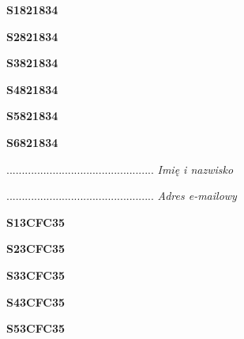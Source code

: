 \begin{turn}{90}\huge \textbf{S1821834}\end{turn}

\begin{turn}{90}\huge \textbf{S2821834}\end{turn}

\begin{turn}{90}\huge \textbf{S3821834}\end{turn}

\begin{turn}{90}\huge \textbf{S4821834}\end{turn}

\begin{turn}{90}\huge \textbf{S5821834}\end{turn}

\begin{turn}{90}\huge \textbf{S6821834}\end{turn}

\begin{turn}{90}\begin{minipage}{\linewidth} \vspace{20mm} ................................................  \textit{Imię i nazwisko}\end{minipage}\end{turn}

\begin{turn}{90}\begin{minipage}{\linewidth} \vspace{20mm} ................................................  \textit{Adres e-mailowy}\end{minipage}\end{turn}

\begin{turn}{90}\huge \textbf{S13CFC35}\end{turn}

\begin{turn}{90}\huge \textbf{S23CFC35}\end{turn}

\begin{turn}{90}\huge \textbf{S33CFC35}\end{turn}

\begin{turn}{90}\huge \textbf{S43CFC35}\end{turn}

\begin{turn}{90}\huge \textbf{S53CFC35}\end{turn}

